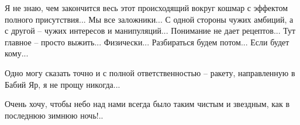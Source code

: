 Я не знаю, чем закончится весь этот происходящий вокруг кошмар с эффектом
полного присутствия... Мы все заложники... С одной стороны чужих амбиций, а с
другой – чужих интересов и манипуляций... Понимание не дает рецептов... Тут
главное – просто выжить... Физически... Разбираться будем потом... Если будет
кому... 

Одно могу сказать точно и с полной ответственностью – ракету, направленную в
Бабий Яр, я не прощу никогда... 

Очень хочу, чтобы небо над нами всегда было таким чистым и звездным, как в
последнюю зимнюю ночь!..

